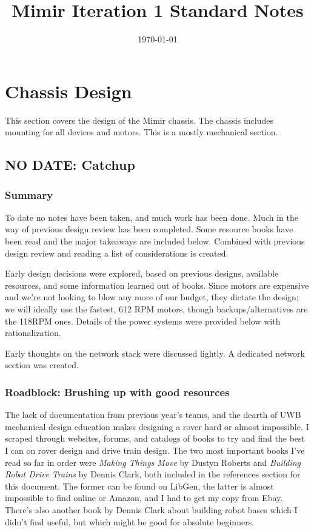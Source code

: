\documentclass[a4paper, 10pt]{article}
\title{Mimir Iteration 1 Standard Notes}
\date{\today}
\begin{document}
\maketitle

\pagebreak

\tableofcontents

\pagebreak

\section{Chassis Design}
This section covers the design of the Mimir chassis. The chassis includes mounting for all devices and motors. This is a mostly mechanical section. 

	\subsection{NO DATE: Catchup}
		\subsubsection{Summary}
		To date no notes have been taken, and much work has been done. Much in the way of previous design review has been completed. Some resource books have been read and the major takeaways are included below. Combined with previous design review and reading a list of considerations is created.
		
		Early design decisions were explored, based on previous designs, available resources, and some information learned out of books. Since motors are expensive and we're not looking to blow any more of our budget, they dictate the design; we will ideally use the fastest, 612 RPM motors, though backups/alternatives are the 118RPM ones. Details of the power systems were provided below with rationalization. 
		
		Early thoughts on the network stack were discussed lightly. A dedicated network section was created.
		
		\subsubsection{Roadblock: Brushing up with good resources}		
		The lack of documentation from previous year's teams, and the dearth of UWB mechanical design education makes designing a rover hard or almost impossible. I scraped through websites, forums, and catalogs of books to try and find the best I can on rover design and drive train design. The two most important books I've read so far in order were \textit{Making Things Move} by Dustyn Roberts and \textit{Building Robot Drive Trains} by Dennis Clark, both included in the references section for this document. The former can be found on LibGen, the latter is almost impossible to find online or Amazon, and I had to get my copy from Ebay. There's also another book by Dennis Clark about building robot bases which I didn't find useful, but which might be good for absolute beginners.
		
\end{document}
